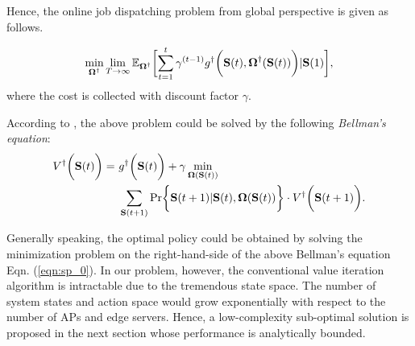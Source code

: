 
Hence, the online job dispatching problem from global perspective is given as follows.
\begin{problem}
    \begin{align}
        \min_{\Policy^{\dagger}} \lim_{T \to \infty}
            \mathbb{E}_{\Policy^{\dagger}}
                \Bracket{\sum_{t=1}^t \gamma^{(t-1)} g^{\dagger}\Paren{\Stat(t), \Policy^{\dagger}(\Stat(t))}|\Stat(1)},
    \end{align}
    where the cost is collected with discount factor $\gamma$.
\end{problem}
According to \cite{sutton1998introduction}, the above problem could be solved by the following \emph{Bellman's equation}:
\begin{align}
    V^{\dagger}\Paren{\Stat(t)} =~&g^{\dagger}\Paren{\Stat(t)} + \gamma \min_{\Policy(\Stat(t))}
        \nonumber\\
        &\sum_{\Stat(t+1)} \Pr\Brace{ \Stat(t+1)|\Stat(t), \Policy(\Stat(t)) } \cdot V^{\dagger}\Paren{\Stat(t+1)}.
    \label{eqn:sp_0}
\end{align}

Generally speaking, the optimal policy could be obtained by solving the minimization problem on the right-hand-side of the above Bellman's equation Eqn. (\ref{eqn:sp_0}).
In our problem, however, the conventional value iteration algorithm is intractable due to the tremendous state space.
The number of system states and action space would grow exponentially with respect to the number of APs and edge servers.
Hence, a low-complexity sub-optimal solution is proposed in the next section whose performance is analytically bounded.

